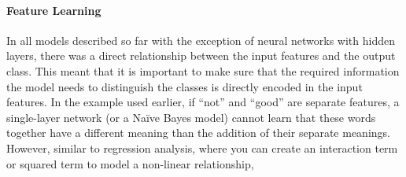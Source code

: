 \paragraph{Feature Learning}
In all models described so far with the exception of neural networks with hidden layers,
there was a direct relationship between the input features and the output class.
This meant that it is important to make sure that the required information the model needs to distinguish the classes
is directly encoded in the input features.
In the example used earlier, if ``not'' and ``good'' are separate features, a single-layer network (or a Na\"ive Bayes model)
cannot learn that these words together have a different meaning than the addition of their separate meanings.
However, similar to regression analysis, where you can create an interaction term or squared term to model a non-linear relationship,
